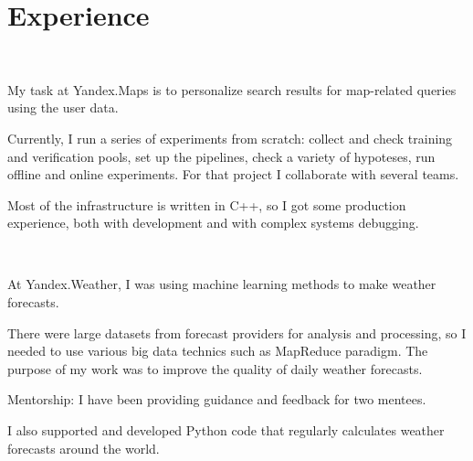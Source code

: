 \documentclass[letterpaper]{deedy-resume} %
\begin{document}
\begin{minipage}[t][0.75\textheight][t]{0.6\textwidth} %


\section{Experience}
\sectionspace

\\
\sectionspace

\vspace{\topsep} %
\begin{tightitemize}
\item My task at Yandex.Maps is to personalize search results for map-related queries using the user data.
\item Currently, I run a series of experiments from scratch: collect and check training and verification pools, set up the pipelines, check a variety of hypoteses, run offline and online experiments. For that project I collaborate with several teams.
\item Most of the infrastructure is written in C++, so I got some production experience, both with development and with complex systems debugging.
\end{tightitemize}

\sectionspace


\\
\sectionspace

\begin{tightitemize}
\item At Yandex.Weather, I was using machine learning methods to make weather forecasts.
\item There were large datasets from forecast providers for analysis and processing, so I needed to use various big data technics such as MapReduce paradigm. The purpose of my work was to improve the quality of daily weather forecasts.
\item Mentorship: I have been providing guidance and feedback for two mentees.
\item I also supported and developed Python code that regularly calculates weather forecasts around the world.
\end{tightitemize}


\end{minipage}
\end{document}
